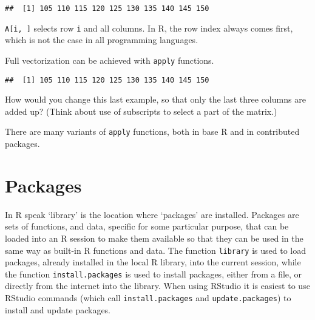 \documentclass[paper=a4,10pt,div=17,headsepline,BCOR=12mm,twoside,open=right]{scrbook}\usepackage{knitr}
\begin{document}
\begin{knitrout}\footnotesize
{}\color{fgcolor}\begin{kframe}
\begin{alltt}
 \hlkwb{<-} \hlstd{(} 
   \hlopt{:}
   \hlkwb{<-} 
\hlstd{\}}
\end{alltt}
\begin{verbatim}
##  [1] 105 110 115 120 125 130 135 140 145 150
\end{verbatim}
\end{kframe}
\end{knitrout}

\texttt{A[i, ]} selects row \texttt{i} and all columns. In R, the row index always comes first, which is not the case in all programming languages.

Full vectorization can be achieved with \texttt{apply} functions.

\begin{knitrout}\footnotesize
{}\color{fgcolor}\begin{kframe}
\begin{alltt}
 \hlkwb{<-}   \hlstd{=}  
\end{alltt}
\begin{verbatim}
##  [1] 105 110 115 120 125 130 135 140 145 150
\end{verbatim}
\end{kframe}
\end{knitrout}

How would you change this last example, so that only the last three columns are added up? (Think about use of subscripts to select a part of the matrix.)

There are many variants of \texttt{apply} functions, both in base R and in contributed packages.

\section{Packages}

In R speak `library' is the location where `packages' are installed. Packages are sets of functions, and data, specific for some particular purpose, that can be loaded into an R session to make them available so that they can be used in the same way as built-in R functions and data. The function \texttt{library} is used to load packages, already installed in the local R library, into the current session, while the function \texttt{install.packages} is used to install packages, either from a file, or directly from the internet into the library. When using RStudio it is easiest to use RStudio commands (which call \texttt{install.packages} and \texttt{update.packages}) to install and update packages.
\end{document}
